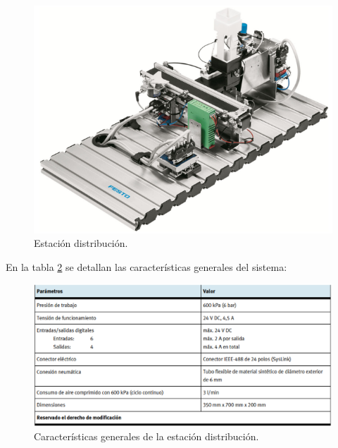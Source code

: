 \begin{figure} [h!]
  \begin{center}
    \includegraphics[width=12.5cm]{figs/estacion_distribucion_1}
  \end{center}
  \caption{\centering Estación distribución. \cite{estacion_distribucion}}
  \label{fig:estacion_distribucion_1}
\end{figure} 

En la tabla \ref{fig:estacion_distribucion_3} se detallan las características generales del sistema:

\begin{figure} [h!]
  \begin{center}
    \includegraphics[width=15cm]{figs/estacion_distribucion_3}
  \end{center}
  \caption{\centering Características generales de la estación distribución. \cite{estacion_distribucion}}
  \label{fig:estacion_distribucion_3}
\end{figure} 

\clearpage

